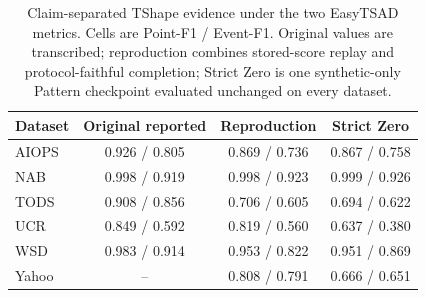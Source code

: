 \begin{table}[t]
\caption{Claim-separated TShape evidence under the two EasyTSAD metrics. Cells are Point-F1 / Event-F1. Original values are transcribed; reproduction combines stored-score replay and protocol-faithful completion; Strict Zero is one synthetic-only Pattern checkpoint evaluated unchanged on every dataset.}
\label{tab:tshape-claim-boundary}
\centering
\scriptsize
\setlength{\tabcolsep}{3.0pt}
\begin{tabular}{lccc}
\toprule
Dataset & Original reported & Reproduction & Strict Zero \\
\midrule
AIOPS & 0.926 / 0.805 & 0.869 / 0.736 & 0.867 / 0.758 \\
NAB & 0.998 / 0.919 & 0.998 / 0.923 & 0.999 / 0.926 \\
TODS & 0.908 / 0.856 & 0.706 / 0.605 & 0.694 / 0.622 \\
UCR & 0.849 / 0.592 & 0.819 / 0.560 & 0.637 / 0.380 \\
WSD & 0.983 / 0.914 & 0.953 / 0.822 & 0.951 / 0.869 \\
Yahoo & -- & 0.808 / 0.791 & 0.666 / 0.651 \\
\bottomrule
\end{tabular}
\end{table}
